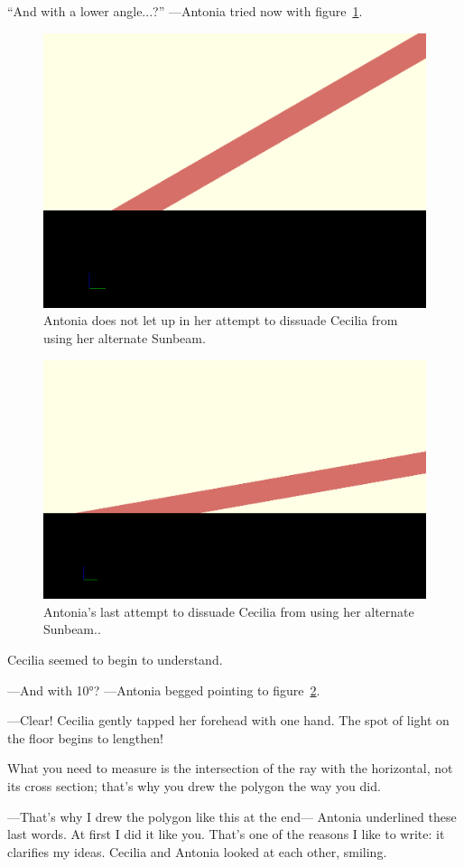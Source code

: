 ``And with a lower angle...?'' ---Antonia tried now with figure~\ref{fig:otro-rayo-30}.

  \begin{figure}[ht]
  \centering
    \includegraphics[width=.5\textwidth]{imagenes/otro-rayo-30}
    \caption[Sunbeam alternative  IV]{Antonia does not let up in her attempt to dissuade Cecilia from using her alternate Sunbeam.}
\label{fig:otro-rayo-30}
\end{figure}



    \begin{figure}[h!]
  \centering
    \includegraphics[width=.5\textwidth]{imagenes/otro-rayo-10}
    \caption[Sunbeam alternative  V]{Antonia's last attempt to dissuade Cecilia from using her alternate Sunbeam..}%
\label{fig:otro-rayo-10}
\end{figure}



Cecilia seemed to begin to understand.

---And with 10\si{\degree}? ---Antonia begged pointing to figure~\ref{fig:otro-rayo-10}.

---Clear! Cecilia gently tapped her forehead with one hand.
The spot of light on the floor begins to lengthen! 

What you need to measure is the intersection of the ray with the horizontal, not its cross section; that's why you drew the polygon the way you did.

---That's why I drew the polygon like this at the end--- Antonia underlined these last words. At first I did it like you. That's one of the reasons I like to write: it clarifies my ideas. Cecilia and Antonia looked at each other, smiling.

  


